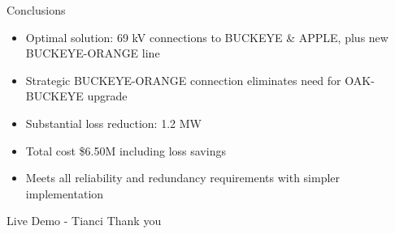 \documentclass{beamer}
\begin{document}
\begin{frame}{Conclusions}
	\begin{itemize}
		\item Optimal solution: 69 kV connections to BUCKEYE \& APPLE, plus new BUCKEYE-ORANGE line
		\item Strategic BUCKEYE-ORANGE connection eliminates need for OAK-BUCKEYE upgrade
		\item Substantial loss reduction: 1.2 MW
		\item Total cost \$6.50M including loss savings
		\item Meets all reliability and redundancy requirements with simpler implementation
	\end{itemize}
\end{frame}
	
	\begin{frame}{Live Demo - Tianci}
		\centering
		\Large{Thank you}
	\end{frame}
	
\end{document}
